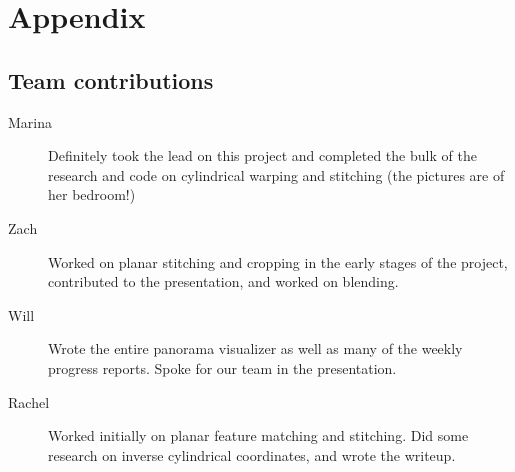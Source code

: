 \documentclass[10pt,twocolumn,letterpaper]{article}
\begin{document}
{\small


}

\section*{Appendix}

\subsection*{Team contributions}
\begin{description}
\item[Marina] Definitely took the lead on this project and completed the bulk of the research and code on cylindrical warping and stitching (the pictures are of her bedroom!)

\item[Zach] Worked on planar stitching and cropping in the early stages of the project, contributed to the presentation, and worked on blending.

\item [Will] Wrote the entire panorama visualizer as well as many of the weekly progress reports. Spoke for our team in the presentation. 

\item [Rachel] Worked initially on planar feature matching and stitching. Did some research on inverse cylindrical coordinates, and wrote the writeup.
\end{description}
\end{document}
